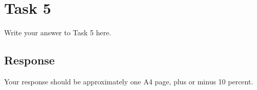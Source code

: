 
\section{Task 5}

Write your answer to Task 5 here.

\subsection{Response}

Your response should be approximately one A4 page, plus or minus 10 percent.